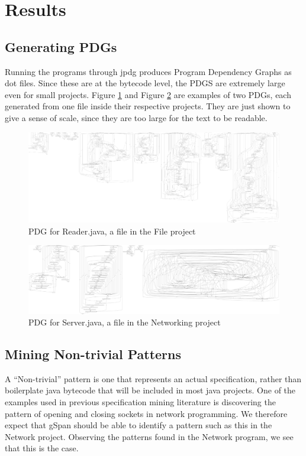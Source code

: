 \documentclass[12pt]{article}
\begin{document}
\section{Results}
\subsection{Generating PDGs}
Running the programs through jpdg produces Program Dependency Graphs as dot files. Since these are at the bytecode level, the PDGS are extremely large even for small projects. Figure \ref{reader_pdg} and Figure \ref{server_pdg} are examples of two PDGs, each generated from one file inside their respective projects. They are just shown to give a sense of scale, since they are too large for the text to be readable.

\begin{figure}[ht]
\centerline{
\includegraphics[width=\linewidth]{patterns/reader_pdg_full.png}
}
\caption{\label{reader_pdg}
    PDG for Reader.java, a file in the File project
}
\end{figure}


\begin{figure}[ht]
\centerline{
\includegraphics[width=\linewidth]{patterns/full_network_small.png}
}
\caption{\label{server_pdg}
    PDG for Server.java, a file in the Networking project
}
\end{figure}

\subsection{Mining Non-trivial Patterns}
A ``Non-trivial'' pattern is one that represents an actual specification, rather than boilerplate java bytecode that will be included in most java projects. One of the examples used in previous specification mining literature is discovering the pattern of opening and closing sockets in network programming. We therefore expect that gSpan should be able to identify a pattern such as this in the Network project. Observing the patterns found in the Network program, we see that this is the case.
\end{document}
